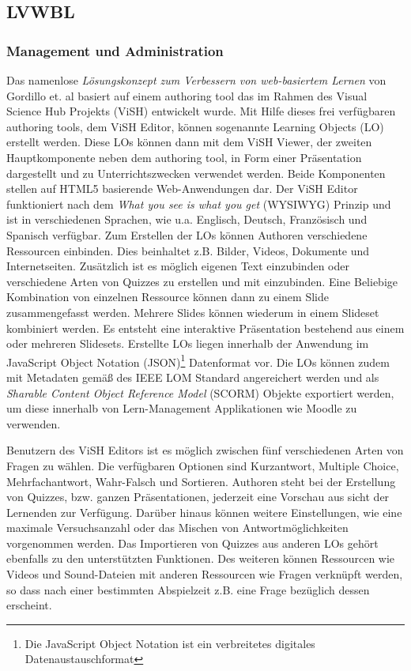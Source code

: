 \documentclass[conference]{IEEEtran}
\begin{document}
\subsection{LVWBL}
\subsubsection{Management und Administration}
Das namenlose \emph{Lösungskonzept zum Verbessern von web-basiertem Lernen} von Gordillo et. al basiert auf einem authoring tool das im Rahmen des Visual Science Hub Projekts (ViSH) \cite{Barra2014} entwickelt wurde. Mit Hilfe dieses frei verfügbaren authoring tools, dem ViSH Editor, können sogenannte Learning Objects (LO) erstellt werden. Diese LOs können dann mit dem ViSH Viewer, der zweiten Hauptkomponente neben dem authoring tool, in Form einer Präsentation dargestellt und zu Unterrichtszwecken verwendet werden. Beide Komponenten stellen auf HTML5 basierende Web-Anwendungen dar. Der ViSH Editor funktioniert nach dem \emph{What you see is what you get} (WYSIWYG) Prinzip und ist in verschiedenen Sprachen, wie u.a. Englisch, Deutsch, Französisch und Spanisch verfügbar. Zum Erstellen der LOs können Authoren verschiedene Ressourcen einbinden. Dies beinhaltet z.B. Bilder, Videos, Dokumente und Internetseiten. Zusätzlich ist es möglich eigenen Text einzubinden oder verschiedene Arten von Quizzes zu erstellen und mit einzubinden. Eine Beliebige Kombination von einzelnen Ressource können dann zu einem Slide zusammengefasst werden. Mehrere Slides können wiederum in einem Slideset kombiniert werden. Es entsteht eine interaktive Präsentation bestehend aus einem oder mehreren Slidesets. Erstellte LOs liegen innerhalb der Anwendung im JavaScript Object Notation (JSON)\footnote{Die JavaScript Object Notation ist ein verbreitetes digitales Datenaustauschformat} Datenformat vor. Die LOs können zudem mit Metadaten gemäß des IEEE LOM Standard angereichert werden und als \emph{Sharable Content Object Reference Model} (SCORM) Objekte exportiert werden, um diese innerhalb von Lern-Management Applikationen wie Moodle zu verwenden. \cite[p. 3]{Gordillo2015}

Benutzern des ViSH Editors ist es möglich zwischen fünf verschiedenen Arten von Fragen zu wählen. Die verfügbaren Optionen sind Kurzantwort, Multiple Choice, Mehrfachantwort, Wahr-Falsch und Sortieren. Authoren steht bei der Erstellung von Quizzes, bzw. ganzen Präsentationen, jederzeit eine Vorschau aus sicht der Lernenden zur Verfügung. Darüber hinaus können weitere Einstellungen, wie eine maximale Versuchsanzahl oder das Mischen von Antwortmöglichkeiten vorgenommen werden. Das Importieren von Quizzes aus anderen LOs gehört ebenfalls zu den unterstützten Funktionen. Des weiteren können Ressourcen wie Videos und Sound-Dateien mit anderen Ressourcen wie Fragen verknüpft werden, so dass nach einer bestimmten Abspielzeit z.B. eine Frage bezüglich dessen erscheint. \cite[p. 3f]{Gordillo2015}
\\
\end{document}

